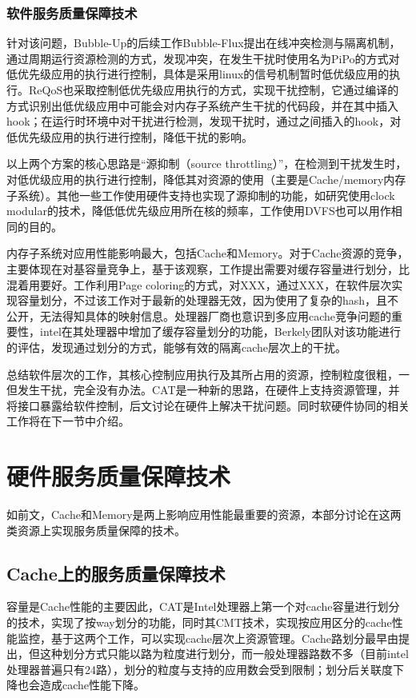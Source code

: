 \subsubsection{软件服务质量保障技术}


针对该问题，Bubble-Up的后续工作Bubble-Flux提出在线冲突检测与隔离机制，通过周期运行资源检测的方式，发现冲突，在发生干扰时使用名为PiPo的方式对低优先级应用的执行进行控制，具体是采用linux的信号机制暂时低优级应用的执行。ReQoS\cite{}也采取控制低优先级应用执行的方式，实现干扰控制，它通过编译的方式识别出低优级应用中可能会对内存子系统产生干扰的代码段，并在其中插入hook；在运行时环境中对干扰进行检测，发现干扰时，通过之间插入的hook，对低优先级应用的执行进行控制，降低干扰的影响。

以上两个方案的核心思路是“源抑制（source throttling）”，在检测到干扰发生时，对低优级应用的执行进行控制，降低其对资源的使用（主要是Cache/memory内存子系统）。其他一些工作使用硬件支持也实现了源抑制的功能，如研究\cite{}使用clock modular的技术，降低低优先级应用所在核的频率，工作\cite{}使用DVFS也可以用作相同的目的。

内存子系统对应用性能影响最大，包括Cache和Memory。对于Cache资源的竞争，主要体现在对基容量竞争上，基于该观察，工作\cite{}提出需要对缓存容量进行划分，比混着用要好。工作\cite{}利用Page coloring的方式，对XXX，通过XXX，在软件层次实现容量划分，不过该工作对于最新的处理器无效，因为使用了复杂的hash，且不公开，无法得知具体的映射信息。处理器厂商也意识到多应用cache竞争问题的重要性，intel在其处理器中增加了缓存容量划分的功能，Berkely团队对该功能进行的评估\cite{}，发现通过划分的方式，能够有效的隔离cache层次上的干扰。

总结软件层次的工作，其核心控制应用执行及其所占用的资源，控制粒度很粗，一但发生干扰，完全没有办法。CAT是一种新的思路，在硬件上支持资源管理，并将接口暴露给软件控制，后文讨论在硬件上解决干扰问题。同时软硬件协同的相关工作将在下一节中介绍。


\section{硬件服务质量保障技术}

如前文，Cache和Memory是两上影响应用性能最重要的资源，本部分讨论在这两类资源上实现服务质量保障的技术。


\subsection{Cache上的服务质量保障技术}

容量是Cache性能的主要因此，CAT是Intel处理器上第一个对cache容量进行划分的技术，实现了按way划分的功能，同时其CMT技术，实现按应用区分的cache性能监控，基于这两个工作，可以实现cache层次上资源管理。Cache路划分最早由\cite{}提出，但这种划分方式只能以路为粒度进行划分，而一般处理器路数不多（目前intel处理器普遍只有24路），划分的粒度与支持的应用数会受到限制；划分后关联度下降也会造成cache性能下降。

